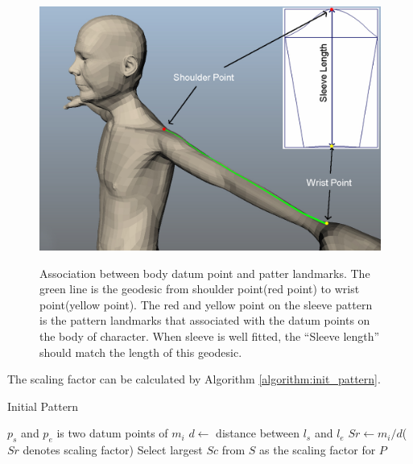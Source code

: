 \begin{figure}[H]
	\centering
	\includegraphics[width=1.0\columnwidth]{../images/body_pattern_mapping}\\[0.1cm]
    \caption[Association between body datum point and pattern landmarks]{Association between body datum point and patter landmarks. The green line is the geodesic from shoulder point(red point) to wrist point(yellow point). The red and yellow point on the sleeve pattern is the pattern landmarks that associated with the datum points on the body of character. When sleeve is well fitted, the ``Sleeve length'' should match the length of this geodesic.}
    \label{figure:pattern_body_relation}
\end{figure}

The scaling factor can be calculated by Algorithm \ref{algorithm:init_pattern}.

\begin{algorithm}
\caption{Initial Pattern}\label{algorithm:init_pattern}
\begin{algorithmic}[1]
		\State $p_{s}$ and $p_{e}$ is two datum points of $m_{i}$ 
		\State $d \gets$ distance between $l_{s}$ and $l_{e}$
		\State $Sr \gets m_{i} / d$($Sr$ denotes scaling factor)
	\EndFor
	\State Select largest $Sc$ from $S$ as the scaling factor for $P$
\EndProcedure
\end{algorithmic}
\end{algorithm}

